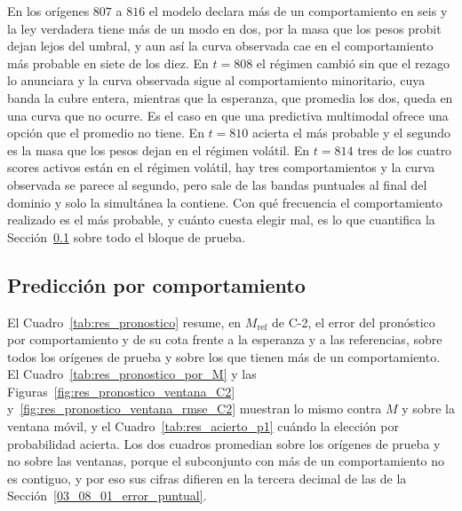 En los orígenes $807$ a $816$ el modelo declara más de un comportamiento en seis y la ley verdadera tiene más de un modo en dos, por la masa que los pesos probit dejan lejos del umbral, y aun así la curva observada cae en el comportamiento más probable en siete de los diez. En $t = 808$ el régimen cambió sin que el rezago lo anunciara y la curva observada sigue al comportamiento minoritario, cuya banda la cubre entera, mientras que la esperanza, que promedia los dos, queda en una curva que no ocurre. Es el caso en que una predictiva multimodal ofrece una opción que el promedio no tiene. En $t = 810$ acierta el más probable y el segundo es la masa que los pesos dejan en el régimen volátil. En $t = 814$ tres de los cuatro scores activos están en el régimen volátil, hay tres comportamientos y la curva observada se parece al segundo, pero sale de las bandas puntuales al final del dominio y solo la simultánea la contiene. Con qué frecuencia el comportamiento realizado es el más probable, y cuánto cuesta elegir mal, es lo que cuantifica la Sección~\ref{03_08_04_pronostico} sobre todo el bloque de prueba.

\subsection{Predicción por comportamiento}
\label{03_08_04_pronostico}

El Cuadro~\ref{tab:res_pronostico} resume, en $M_{\mathrm{ref}}$ de C-2, el error del pronóstico por comportamiento y de su cota frente a la esperanza y a las referencias, sobre todos los orígenes de prueba y sobre los que tienen más de un comportamiento. El Cuadro~\ref{tab:res_pronostico_por_M} y las Figuras~\ref{fig:res_pronostico_ventana_C2} y~\ref{fig:res_pronostico_ventana_rmse_C2} muestran lo mismo contra $M$ y sobre la ventana móvil, y el Cuadro~\ref{tab:res_acierto_p1} cuándo la elección por probabilidad acierta. Los dos cuadros promedian sobre los orígenes de prueba y no sobre las ventanas, porque el subconjunto con más de un comportamiento no es contiguo, y por eso sus cifras difieren en la tercera decimal de las de la Sección~\ref{03_08_01_error_puntual}.

